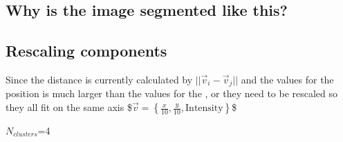\documentclass[letterpaper,10pt,english]{sphinxmanual}
\begin{document}
\begin{sphinxVerbatim}[commandchars=\\\{\}]
\PYG{p}{[}\PYG{p}{]}    
\end{sphinxVerbatim}

\noindent{}


\subsection{Why is the image segmented like this?}
\label{\detokenize{05-AdvancedSegmentation:why-is-the-image-segmented-like-this}}

\subsection{Rescaling components}
\label{\detokenize{05-AdvancedSegmentation:rescaling-components}}
\sphinxAtStartPar
Since the distance is currently calculated by \(||\vec{v}_i-\vec{v}_j||\) and the values for the position is much larger than the values for the  ,  or  they need to be rescaled so they all fit on the same axis
\$\(\vec{v} = \left\{\frac{x}{10}, \frac{y}{10}, \textrm{Intensity}\right\}\)\$

\sphinxAtStartPar
\(N_{clusters}\)=4
\end{document}
